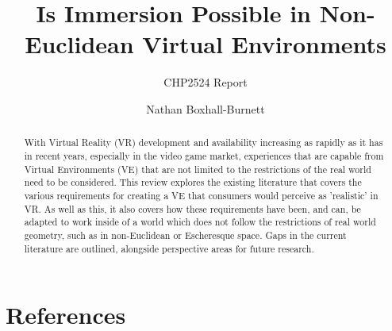 \documentclass[abstract=on,12pt]{scrreprt}
\title{Is Immersion Possible in Non-Euclidean Virtual Environments}
\subtitle{CHP2524 Report}
\author{Nathan Boxhall-Burnett}
\begin{document}
	\maketitle

	\begin{abstract}
		With Virtual Reality (VR) development and availability increasing as rapidly as it has in recent years, especially in the video game market, experiences that are capable from Virtual Environments (VE) that are not limited to the restrictions of the real world need to be considered.
		This review explores the existing literature that covers the various requirements for creating a VE that consumers would perceive as 'realistic' in VR. As well as this, it also covers how these requirements have been, and can, be adapted to work inside of a world which does not follow the restrictions of real world geometry, such as in non-Euclidean or Escheresque space.
		Gaps in the current literature are outlined, alongside perspective areas for future research.
	\end{abstract}

	\tableofcontents
	
	

	\nocite{*}	%
	\begingroup
		\chapter{References}
		\renewcommand{\chapter}[2]{}		%
	\endgroup
	
	

\end{document}
